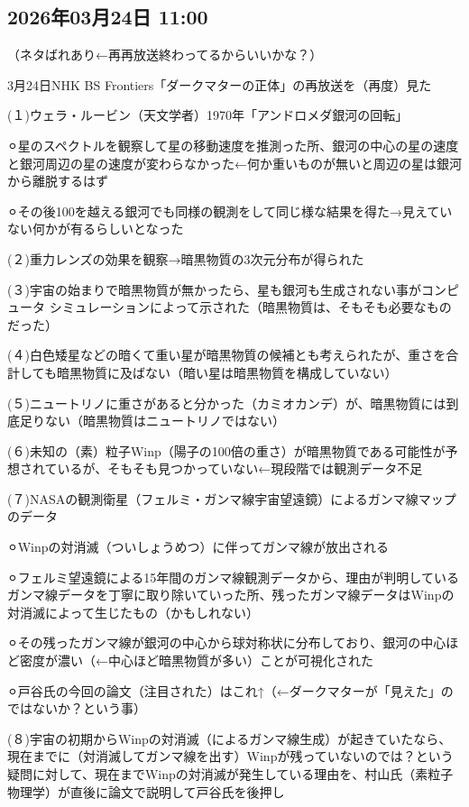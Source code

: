 \subsection*{2026年03月24日 11:00}

（ネタばれあり←再再放送終わってるからいいかな？）

3月24日NHK BS Frontiers「ダークマターの正体」の再放送を（再度）見た

(１)ウェラ・ルービン（天文学者）1970年「アンドロメダ銀河の回転」

⚪︎星のスペクトルを観察して星の移動速度を推測った所、銀河の中心の星の速度と銀河周辺の星の速度が変わらなかった←何か重いものが無いと周辺の星は銀河から離脱するはず

⚪︎その後100を越える銀河でも同様の観測をして同じ様な結果を得た→見えていない何かが有るらしいとなった

(２)重力レンズの効果を観察→暗黒物質の3次元分布が得られた

(３)宇宙の始まりで暗黒物質が無かったら、星も銀河も生成されない事がコンピュータ シミュレーションによって示された（暗黒物質は、そもそも必要なものだった）

(４)白色矮星などの暗くて重い星が暗黒物質の候補とも考えられたが、重さを合計しても暗黒物質に及ばない（暗い星は暗黒物質を構成していない）

(５)ニュートリノに重さがあると分かった（カミオカンデ）が、暗黒物質には到底足りない（暗黒物質はニュートリノではない）

(６)未知の（素）粒子Winp（陽子の100倍の重さ）が暗黒物質である可能性が予想されているが、そもそも見つかっていない←現段階では観測データ不足

(７)NASAの観測衛星（フェルミ・ガンマ線宇宙望遠鏡）によるガンマ線マップのデータ

⚪︎Winpの対消滅（ついしょうめつ）に伴ってガンマ線が放出される

⚪︎フェルミ望遠鏡による15年間のガンマ線観測データから、理由が判明しているガンマ線データを丁寧に取り除いていった所、残ったガンマ線データはWinpの対消滅によって生じたもの（かもしれない）

⚪︎その残ったガンマ線が銀河の中心から球対称状に分布しており、銀河の中心ほど密度が濃い（←中心ほど暗黒物質が多い）ことが可視化された

⚪︎戸谷氏の今回の論文（注目された）はこれ↑（←ダークマターが「見えた」のではないか？という事）

(８)宇宙の初期からWinpの対消滅（によるガンマ線生成）が起きていたなら、現在までに（対消滅してガンマ線を出す）Winpが残っていないのでは？という疑問に対して、現在までWinpの対消滅が発生している理由を、村山氏（素粒子物理学）が直後に論文で説明して戸谷氏を後押し

